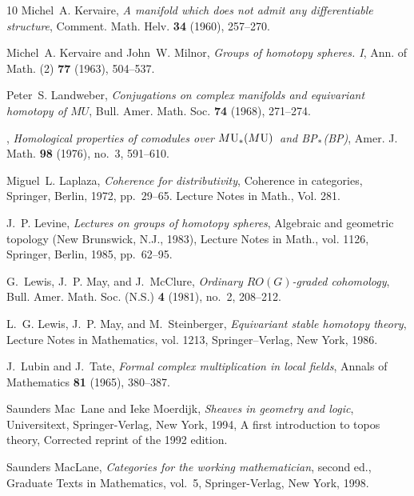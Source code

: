 \documentclass{amsart}
\theoremstyle{definition}
\theoremstyle{remark}
\begin{document}
\begin{thebibliography}{10}
Michel~A. Kervaire, \emph{A manifold which does not admit any differentiable
  structure}, Comment. Math. Helv. \textbf{34} (1960), 257--270.

Michel~A. Kervaire and John~W. Milnor, \emph{Groups of homotopy spheres. {I}},
  Ann. of Math. (2) \textbf{77} (1963), 504--537.

Peter~S. Landweber, \emph{Conjugations on complex manifolds and equivariant
  homotopy of {$MU$}}, Bull. Amer. Math. Soc. \textbf{74} (1968), 271--274.

\bysame, \emph{Homological properties of comodules over {$M{\rm U}\sb\ast
  (M{\rm U})$}\ and {BP{$\sb\ast $}}({BP})}, Amer. J. Math. \textbf{98} (1976),
  no.~3, 591--610. 

Miguel~L. Laplaza, \emph{Coherence for distributivity}, Coherence in
  categories, Springer, Berlin, 1972, pp.~29--65. Lecture Notes in Math., Vol.
  281. 

J.~P. Levine, \emph{Lectures on groups of homotopy spheres}, Algebraic and
  geometric topology ({N}ew {B}runswick, {N}.{J}., 1983), Lecture Notes in
  Math., vol. 1126, Springer, Berlin, 1985, pp.~62--95. 

G.~Lewis, J.~P. May, and J.~McClure, \emph{Ordinary {$RO(G)$}-graded
  cohomology}, Bull. Amer. Math. Soc. (N.S.) \textbf{4} (1981), no.~2,
  208--212. 

L.~G. Lewis, J.~P. May, and M.~Steinberger, \emph{Equivariant stable homotopy
  theory}, Lecture Notes in Mathematics, vol. 1213, Springer--Verlag, New York,
  1986.

J.~Lubin and J.~Tate, \emph{Formal complex multiplication in local fields},
  Annals of Mathematics \textbf{81} (1965), 380--387.

Saunders Mac~Lane and Ieke Moerdijk, \emph{Sheaves in geometry and logic},
  Universitext, Springer-Verlag, New York, 1994, A first introduction to topos
  theory, Corrected reprint of the 1992 edition. 

Saunders MacLane, \emph{Categories for the working mathematician}, second ed.,
  Graduate Texts in Mathematics, vol.~5, Springer-Verlag, New York, 1998.


\end{thebibliography}
\end{document}
